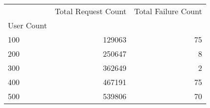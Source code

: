 \begin{tabular}{lrr}
\toprule
 & Total Request Count & Total Failure Count \\
User Count &  &  \\
\midrule
100 & 129063 & 75 \\
200 & 250647 & 8 \\
300 & 362649 & 2 \\
400 & 467191 & 75 \\
500 & 539806 & 70 \\
\bottomrule
\end{tabular}
